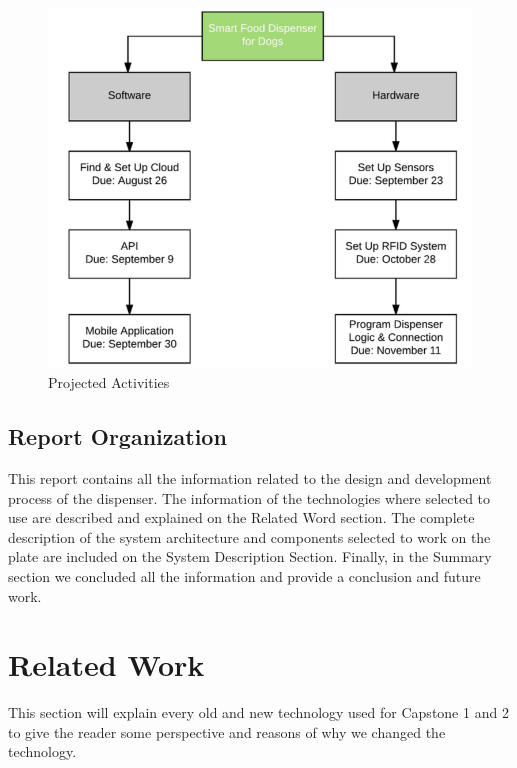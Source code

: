 \documentclass[12pt]{article}
\begin{document}
\begin{figure}[!htb]
  \includegraphics[width=\textwidth]{Figures/ProjectedActivities}
  \caption{Projected Activities}
  \label{fig:ProjectedActivities}
\end{figure}

\newpage

\subsection{Report Organization}

This report contains all the information related to the design and development process of the dispenser. The information of the technologies where selected to use are described and explained on the Related Word section. The complete description of the system architecture and components selected to work on the plate are included on the System Description Section. Finally, in the Summary section we concluded all the information and provide a conclusion and future work.


\section{Related Work}

This section will explain every old and new technology used for Capstone 1 and 2 to give the reader some perspective and reasons of why we changed the technology.
\end{document}
